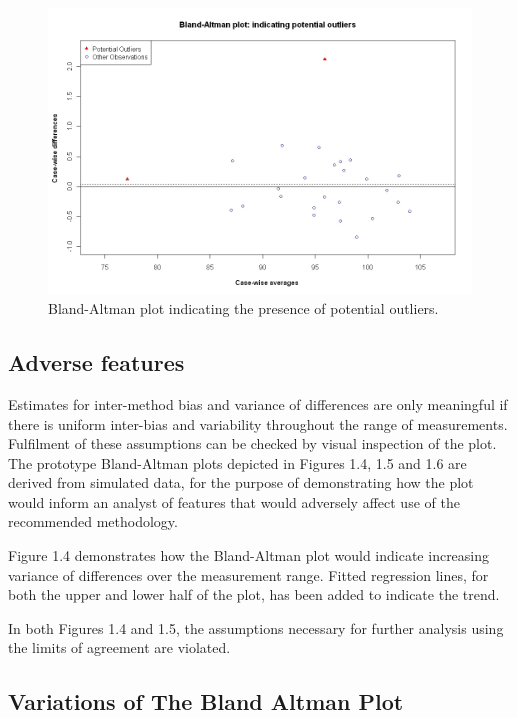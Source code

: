 \documentclass[Main.tex]{subfiles}
\begin{document}
	\begin{figure}[h!]
		\begin{center}
			\includegraphics[width=125mm]{images/BAOutliers.jpeg}
			\caption{Bland-Altman plot indicating the presence of potential outliers.}\label{Outliers}
		\end{center}
	\end{figure}


	\subsection{Adverse features}
	
	Estimates for inter-method bias and variance of differences are only meaningful if there is uniform inter-bias and variability throughout the range of measurements. Fulfilment of these assumptions can be checked by visual inspection of the plot. The prototype Bland-Altman plots depicted in Figures 1.4, 1.5 and 1.6 are derived from simulated data, for the purpose of demonstrating how the plot would inform an analyst of features that would adversely affect use of the recommended methodology.
	
	Figure 1.4 demonstrates how the Bland-Altman plot would indicate increasing variance of differences over the measurement range. Fitted regression lines, for both the upper and lower half of the plot, has been added to indicate the trend. 
	
 In both Figures 1.4 and 1.5, the assumptions necessary for further analysis using the limits of agreement are violated.
	




	

	\subsection{Variations of The Bland Altman Plot}
\end{document}
